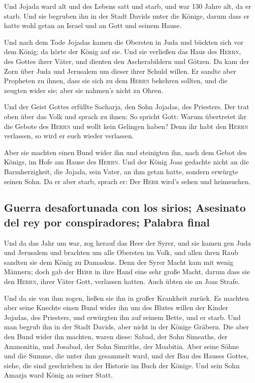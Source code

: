  Und Jojada ward alt und des Lebens satt und starb, und
war 130 Jahre alt, da er starb.  Und sie begruben ihn in
der Stadt Davids unter die Könige, darum dass er hatte wohl getan an
Israel und an Gott und seinem Hause.

 Und nach dem Tode Jojadas kamen die Obersten in Juda und
bückten sich vor dem König; da hörte der König auf sie. 
Und sie verließen das Haus des \textsc{Herrn}, des Gottes ihrer Väter,
und dienten den Ascherabildern und Götzen. Da kam der Zorn über Juda und
Jerusalem um dieser ihrer Schuld willen.  Er sandte aber
Propheten zu ihnen, dass sie sich zu dem \textsc{Herrn} bekehren
sollten, und die zeugten wider sie; aber sie nahmen's nicht zu Ohren.

 Und der Geist Gottes erfüllte Sacharja, den Sohn
Jojadas, des Priesters. Der trat oben über das Volk und sprach zu ihnen:
So spricht Gott: Warum übertretet ihr die Gebote des \textsc{Herrn} und
wollt kein Gelingen haben? Denn ihr habt den \textsc{Herrn} verlassen,
so wird er euch wieder verlassen.

 Aber sie machten einen Bund wider ihn und steinigten
ihn, nach dem Gebot des Königs, im Hofe am Hause des \textsc{Herrn}.
 Und der König Joas gedachte nicht an die Barmherzigkeit,
die Jojada, sein Vater, an ihm getan hatte, sondern erwürgte seinen
Sohn. Da er aber starb, sprach er: Der \textsc{Herr} wird's sehen und
heimsuchen.

\hypertarget{guerra-desafortunada-con-los-sirios-asesinato-del-rey-por-conspiradores-palabra-final}{%
\subsection{Guerra desafortunada con los sirios; Asesinato del rey por
conspiradores; Palabra
final}\label{guerra-desafortunada-con-los-sirios-asesinato-del-rey-por-conspiradores-palabra-final}}

 Und da das Jahr um war, zog herauf das Heer der Syrer,
und sie kamen gen Juda und Jerusalem und brachten um alle Obersten im
Volk, und allen ihren Raub sandten sie dem König zu Damaskus.
 Denn der Syrer Macht kam mit wenig Männern; doch gab der
\textsc{Herr} in ihre Hand eine sehr große Macht, darum dass sie den
\textsc{Herrn}, ihrer Väter Gott, verlassen hatten. Auch übten sie an
Joas Strafe.

 Und da sie von ihm zogen, ließen sie ihn in großer
Krankheit zurück. Es machten aber seine Knechte einen Bund wider ihn um
des Blutes willen der Kinder Jojadas, des Priesters, und erwürgten ihn
auf seinem Bette, und er starb. Und man begrub ihn in der Stadt Davids,
aber nicht in der Könige Gräbern.  Die aber den Bund
wider ihn machten, waren diese: Sabad, der Sohn Simeaths, der Ammonitin,
und Josabad, der Sohn Simriths, der Moabitin.  Aber seine
Söhne und die Summe, die unter ihm gesammelt ward, und der Bau des
Hauses Gottes, siehe, die sind geschrieben in der Historie im Buch der
Könige. Und sein Sohn Amazja ward König an seiner Statt.


